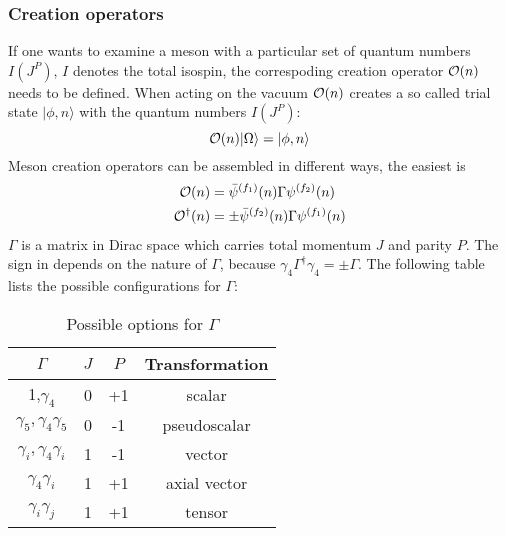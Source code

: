     \subsubsection{Creation operators}
        If one wants to examine a meson with a particular set of quantum numbers $I(J^P)$, $I$ denotes the total isospin, the correspoding creation operator $\mathcal{O}(n)$ needs to be defined. When acting on the vacuum $\mathcal{O}(n)$ creates a so called trial state $|\phi,n\rangle$ with the quantum numbers $I(J^P)$:
        \begin{equation}
            \mathcal{O}(n)|\Omega\rangle = |\phi,n\rangle
        \end{equation}
        Meson creation operators can be assembled in different ways, the easiest is
        \begin{equation}\label{meson_creation_operator}
            \begin{aligned}
                \mathcal{O}(n) &= \bar{\psi}^{(f_1)}(n)\Gamma\psi^{(f_2)}(n)\\
                \mathcal{O}^\dagger(n) &= \pm\bar{\psi}^{(f_2)}(n)\Gamma\psi^{(f_1)}(n)
            \end{aligned}
        \end{equation}
        $\Gamma$ is a matrix in Dirac space which carries total momentum $J$ and parity $P$. The sign in  depends on the nature of $\Gamma$, because $\gamma_4\Gamma^\dagger\gamma_4 = \pm \Gamma$. The following table lists the possible configurations for $\Gamma$:
        \begin{table}[h]
            \centering
            \begin{tabular}{|c|c|c|c|}
            \hline
            \multicolumn{1}{|c|}{$\Gamma$} & \multicolumn{1}{c|}{$J$} & \multicolumn{1}{c|}{$P$} & \multicolumn{1}{c|}{Transformation} \\ \hline
             1,$\gamma_4$ & 0 & +1 &    scalar           \\
             $\gamma_5, \gamma_4\gamma_5$                      &  0                     &  -1                     &  pseudoscalar                     \\
             $\gamma_i,\gamma_4\gamma_i$                      & 1                      &    -1                   &  vector                     \\
             $\gamma_4\gamma_i$                      & 1                      &  +1                     & axial vector                      \\
              $\gamma_i\gamma_j$                     & 1                      & +1                      & tensor                     
            \end{tabular}
            \caption{Possible options for $\Gamma$}
            \label{my-label}
        \end{table}
